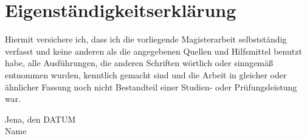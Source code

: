 \chapter{Eigenständigkeitserklärung}

Hiermit versichere ich, dass ich die vorliegende Magisterarbeit
selbstständig verfasst und keine anderen als die angegebenen Quellen
und Hilfsmittel benutzt habe, alle Ausführungen, die anderen Schriften
wörtlich oder sinngemäß entnommen wurden, kenntlich gemacht sind und
die Arbeit in gleicher oder ähnlicher Fassung noch nicht Bestandteil
einer Studien- oder Prüfungsleistung war.

\hspace{5ex}

Jena, den DATUM \\[7ex]
Name

